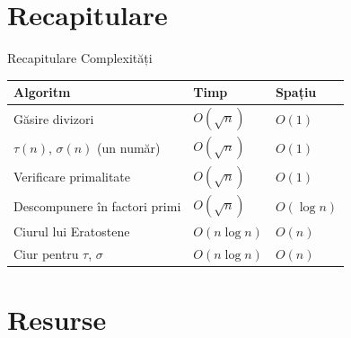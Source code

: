 \documentclass{beamer}
\begin{document}
\section{Recapitulare}

\begin{frame}{Recapitulare \textemdash{} Complexități}
  \begin{center}
  \begin{tabular}{lll}
    \toprule
    Algoritm & Timp & Spațiu \\
    \midrule
    Găsire divizori                  & $O(\sqrt{n})$      & $O(1)$ \\
    $\tau(n)$, $\sigma(n)$ (un număr) & $O(\sqrt{n})$      & $O(1)$ \\
    Verificare primalitate           & $O(\sqrt{n})$      & $O(1)$ \\
    Descompunere în factori primi    & $O(\sqrt{n})$      & $O(\log n)$ \\
    Ciurul lui Eratostene            & $O(n \log n)$ & $O(n)$ \\
    Ciur pentru $\tau$, $\sigma$     & $O(n \log n)$      & $O(n)$ \\
    \bottomrule
  \end{tabular}
  \end{center}
\end{frame}

\section{Resurse}
\end{document}
